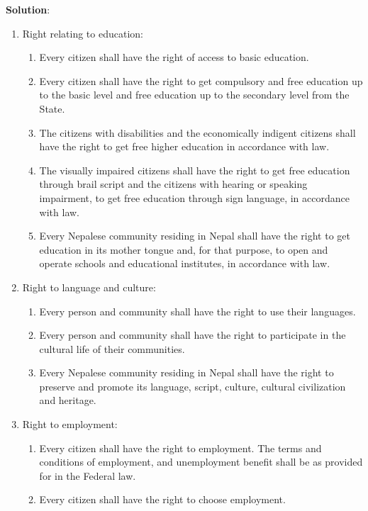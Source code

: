 \documentclass[
]{book}
\newenvironment{solution}{ {\bfseries Solution}:}{}
\begin{document}
\begin{questions}
\begin{solution}
\begin{enumerate}
\item Right relating to education:
\begin{enumerate}
\item Every citizen shall have the right of access to basic education.
\item Every citizen shall have the right to get compulsory and free education up to the basic level and free education up to the secondary level from the State.
\item The citizens with disabilities and the economically indigent citizens shall have the right to get free higher education in accordance with law.
\item The visually impaired citizens shall have the right to get free education through brail script and the citizens with hearing or speaking impairment, to get free education through sign language, in accordance with law.
\item Every Nepalese community residing in Nepal shall have the right to get education in its mother tongue and, for that purpose, to open and operate schools and educational institutes, in accordance with law.
\end{enumerate}

\item Right to language and culture:
\begin{enumerate}
\item Every person and community shall have the right to use their languages.
\item Every person and community shall have the right to participate in the cultural life of their communities.
\item Every Nepalese community residing in Nepal shall have the right to preserve and promote its language, script, culture, cultural civilization and heritage.
\end{enumerate}

\item Right to employment:
\begin{enumerate}
\item Every citizen shall have the right to employment. The terms and conditions of employment, and unemployment benefit shall be as provided for in the Federal law.
\item Every citizen shall have the right to choose employment.
\end{enumerate}


\end{enumerate}
\end{solution}
\end{questions}
\end{document}
